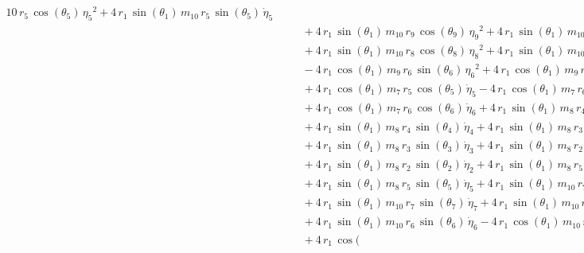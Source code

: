 \begin{eqnarray*}
{10}\,r_{5}\,\cos({\theta_{5}})\,{{\eta_{5}}}^2 + 4\,r_{1}\,\sin({
\theta_{1}})\,m_{10}\,r_{5}\,\sin({\theta_{5}})\,{\dot{\eta}_{5}}
 \\ &&\quad\mbox{} + 4\,r_{1}\,\sin({\theta_{1}})\,m_{10}\,r_{9}\,\cos
({\theta_{9}})\,{{\eta_{9}}}^2 + 4\,r_{1}\,\sin({\theta_{1}})\,m_{10}
\,r_{9}\,\sin({\theta_{9}})\,{\dot{\eta}_{9}} \\ &&\quad\mbox{} + 4\,r
_{1}\,\sin({\theta_{1}})\,m_{10}\,r_{8}\,\cos({\theta_{8}})\,{{\eta_{8
}}}^2 + 4\,r_{1}\,\sin({\theta_{1}})\,m_{10}\,r_{8}\,\sin({\theta_{8}}
)\,{\dot{\eta}_{8}} \\ &&\quad\mbox{} - 4\,r_{1}\,\cos({\theta_{1}})\,
m_{9}\,r_{6}\,\sin({\theta_{6}})\,{{\eta_{6}}}^2 + 4\,r_{1}\,\cos({
\theta_{1}})\,m_{9}\,r_{6}\,\cos({\theta_{6}})\,{\dot{\eta}_{6}}
 \\ &&\quad\mbox{} + 4\,r_{1}\,\cos({\theta_{1}})\,m_{7}\,r_{5}\,\cos(
{\theta_{5}})\,{\dot{\eta}_{5}} - 4\,r_{1}\,\cos({\theta_{1}})\,m_{7}
\,r_{6}\,\sin({\theta_{6}})\,{{\eta_{6}}}^2 \\ &&\quad\mbox{} + 4\,r_{
1}\,\cos({\theta_{1}})\,m_{7}\,r_{6}\,\cos({\theta_{6}})\,{\dot{\eta}
_{6}} + 4\,r_{1}\,\sin({\theta_{1}})\,m_{8}\,r_{4}\,\cos({\theta_{4}})
\,{{\eta_{4}}}^2 \\ &&\quad\mbox{} + 4\,r_{1}\,\sin({\theta_{1}})\,m_{
8}\,r_{4}\,\sin({\theta_{4}})\,{\dot{\eta}_{4}} + 4\,r_{1}\,\sin({
\theta_{1}})\,m_{8}\,r_{3}\,\cos({\theta_{3}})\,{{\eta_{3}}}^2
 \\ &&\quad\mbox{} + 4\,r_{1}\,\sin({\theta_{1}})\,m_{8}\,r_{3}\,\sin(
{\theta_{3}})\,{\dot{\eta}_{3}} + 4\,r_{1}\,\sin({\theta_{1}})\,m_{8}
\,r_{2}\,\cos({\theta_{2}})\,{{\eta_{2}}}^2 \\ &&\quad\mbox{} + 4\,r_{
1}\,\sin({\theta_{1}})\,m_{8}\,r_{2}\,\sin({\theta_{2}})\,{\dot{\eta}
_{2}} + 4\,r_{1}\,\sin({\theta_{1}})\,m_{8}\,r_{5}\,\cos({\theta_{5}})
\,{{\eta_{5}}}^2 \\ &&\quad\mbox{} + 4\,r_{1}\,\sin({\theta_{1}})\,m_{
8}\,r_{5}\,\sin({\theta_{5}})\,{\dot{\eta}_{5}} + 4\,r_{1}\,\sin({
\theta_{1}})\,m_{10}\,r_{7}\,\cos({\theta_{7}})\,{{\eta_{7}}}^2
 \\ &&\quad\mbox{} + 4\,r_{1}\,\sin({\theta_{1}})\,m_{10}\,r_{7}\,\sin
({\theta_{7}})\,{\dot{\eta}_{7}} + 4\,r_{1}\,\sin({\theta_{1}})\,m_{10
}\,r_{6}\,\cos({\theta_{6}})\,{{\eta_{6}}}^2 \\ &&\quad\mbox{} + 4\,r
_{1}\,\sin({\theta_{1}})\,m_{10}\,r_{6}\,\sin({\theta_{6}})\,{
\dot{\eta}_{6}} - 4\,r_{1}\,\cos({\theta_{1}})\,m_{10}\,r_{3}\,\sin({
\theta_{3}})\,{{\eta_{3}}}^2 \\ &&\quad\mbox{} + 4\,r_{1}\,\cos({
}
\end{eqnarray*}
